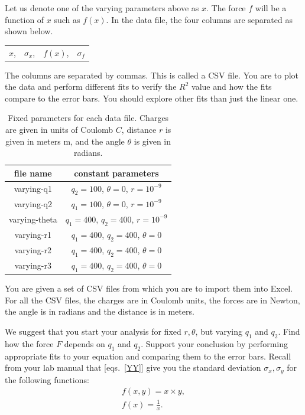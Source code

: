 \documentclass[12pt]{article}
\def\anhkhoi#1{{\color{olive}[#1]}}
\begin{document}
Let us denote one of the varying parameters above as $x$. The force $f$ will be a function of $x$ such as $f(x)$. In the data file, the four columns are separated as shown below.
\begin{table}[h]
\centering
\begin{tabular}{c c c c}
$x$, & $\sigma_x$, & $f(x)$, & $\sigma_f$
\end{tabular}
\end{table}
The columns are separated by commas. This is called a CSV file.
You are to plot the data and perform different fits to verify the $R^2$ value and how the fits compare to the error bars.
You should explore other fits than just the linear one.

\begin{table}[h]
\centering
\begin{tabular}{c|c}
file name & constant parameters \\ \hline
varying-q1 & $q_2=100$, $\theta=0$, $r=10^{-9}$ \\
varying-q2 & $q_1=100$, $\theta=0$, $r=10^{-9}$ \\
varying-theta & $q_1=400$, $q_2=400$, $r=10^{-9}$ \\
varying-r1 & $q_1=400$, $q_2=400$, $\theta=0$ \\
varying-r2 & $q_1=400$, $q_2=400$, $\theta=0$\\
varying-r3 & $q_1=400$, $q_2=400$, $\theta=0$
\end{tabular}
\caption{Fixed parameters for each data file. Charges are given in units of Coulomb $C$, distance $r$ is given in meters m, and the angle $\theta$ is given in radians.}
\label{Tab:constants}
\end{table}

You are given a set of CSV files from which you are to import them into Excel. For all the CSV files, the charges are in Coulomb units, the forces are in Newton, the angle is in radians and the distance is in meters.

We suggest that you start your analysis for fixed $r, \theta$, but varying $q_1$ and $q_2$. Find how the force $F$ depends on $q_1$ and $q_2$. Support your conclusion by performing appropriate fits to your equation and comparing them to the error bars. Recall from your lab manual that \anhkhoi{eqs.~\ref{YY}} give you the standard deviation $\sigma_x, \sigma_y$ for the following functions:
\begin{align}
f(x,y) = x \times y \label{Eq:f=xy} ,\\
f(x) = \frac{1}{x} \label{Eq:f=1/x}.
\end{align} 
\end{document}
